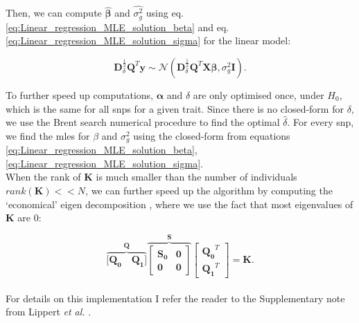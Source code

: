 Then, we can compute $\hat{\boldsymbol{\beta}}$ and $\hat{\sigma_g^2}$ using eq. \eqref{eq:Linear_regression_MLE_solution_beta} and eq. \eqref{eq:Linear_regression_MLE_solution_sigma} for the linear model:

\begin{equation}
    \mathbf{D}^{\frac{1}{2}}_{\delta}\mathbf{Q}^{T}\mathbf{y} \sim \mathcal{N}(\mathbf{D}^{\frac{1}{2}}_{\delta}\mathbf{Q}^{T}\mathbf{X}\boldsymbol{\beta}, \sigma_g^2\mathbf{I}).
\end{equation} 

To further speed up computations, $\boldsymbol{\alpha}$ and $\delta$ are only optimised once, under $H_0$, which is the same for all \gls{snp}s for a given trait.
Since there is no closed-form for $\delta$, we use the Brent search numerical procedure \cite{goddard2009estimating} to find the optimal $\hat{\delta}$.
For every \gls{snp}, we find the \gls{mle}s for $\beta$ and $\sigma^2_g$ using the closed-form from equations \eqref{eq:Linear_regression_MLE_solution_beta},\eqref{eq:Linear_regression_MLE_solution_sigma}.\\

When the rank of $\mathbf{K}$ is much smaller than the number of individuals $rank(\mathbf{K}) << N$,  we can further speed up the algorithm by computing the `economical' eigen decomposition \cite{lippert2011fast}, where we use the fact that most eigenvalues of $\mathbf{K}$ are 0:

\begin{equation}\label{eq:economic_eigen_decomposition}
    \overbrace{[\mathbf{Q_0} \quad \mathbf{Q_1]}}^{\mathbf{Q}}
            \overbrace{\left[\begin{array}{cc}
                \mathbf{S_0} & \mathbf{0}\\
                        \mathbf{0} & \mathbf{0}
            \end{array}\right]}^{\mathbf{S}}
        \left[\begin{array}{c}
            \mathbf{Q_0}^T \\
            \mathbf{Q_1}^T
        \end{array}\right] = \mathbf{K}.
\end{equation}\\

For details on this implementation I refer the reader to the Supplementary note from Lippert \textit{et al.} \cite{lippert2011fast}. \\

